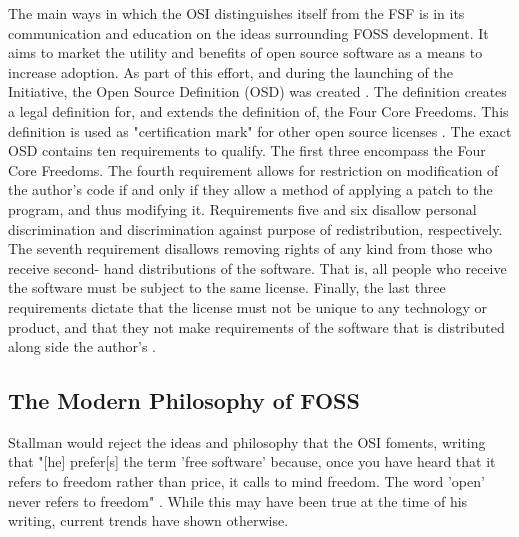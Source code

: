 \documentclass[manuscript,screen,nonacm,12pt]{acmart}
\begin{document}
The main ways in which the OSI distinguishes itself from the FSF is in its
communication and education on the ideas surrounding FOSS development. It aims
to market the utility and benefits of open source software as a means to
increase adoption. As part of this effort, and during the launching of the
Initiative, the Open Source Definition (OSD) was created \cite{OSI2025}. The
definition creates a legal definition for, and extends the definition of, the
Four Core Freedoms. This definition is used as "certification mark" for other
open source licenses \cite{OSI2025}. The exact OSD contains ten requirements to
qualify. The first three encompass the Four Core Freedoms. The fourth
requirement allows for restriction on modification of the author's code if and
only if they allow a method of applying a patch to the program, and thus
modifying it. Requirements five and six disallow personal discrimination and
discrimination against purpose of redistribution, respectively. The seventh
requirement disallows removing rights of any kind from those who receive second-
hand distributions of the software. That is, all people who receive the software
must be subject to the same license. Finally, the last three requirements
dictate that the license must not be unique to any technology or product, and
that they not make requirements of the software that is distributed along side
the author's \cite{OSD2025}.

\subsection{The Modern Philosophy of FOSS}
Stallman would reject the ideas and philosophy that the OSI foments, writing
that "[he] prefer[s] the term 'free software' because, once you have heard that
it refers to freedom rather than price, it calls to mind freedom. The word
'open' never refers to freedom" \cite{stallman_free2002}. While this may have
been true at the time of his writing, current trends have shown otherwise.
\end{document}

